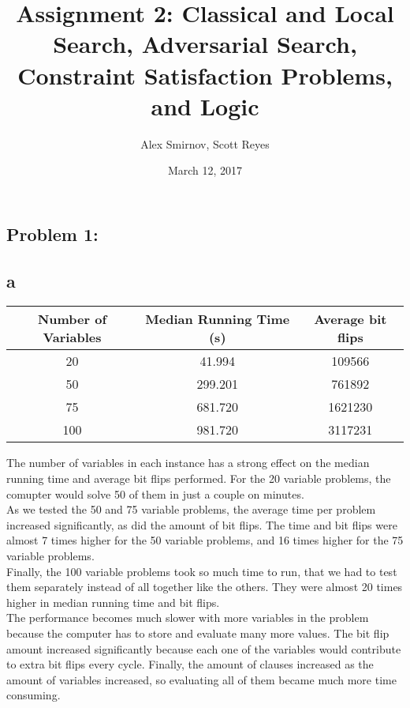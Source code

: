 \documentclass[11pt, oneside]{article}   	%
\title{Assignment 2: Classical and Local Search, Adversarial Search, Constraint Satisfaction Problems, and Logic}
\author{Alex Smirnov, Scott Reyes}
\date{March 12, 2017}							%
\begin{document}
\maketitle
\begin{flushleft}

\section*{Problem 1:}
\subsection*{a}
\begin{center}
\begin{tabular}{ |c|c|c|} 
\hline
Number of Variables & Median Running Time (s) & Average bit flips \\\hline
20 & 41.994 & 109566 \\\hline
50 & 299.201 & 761892 \\\hline
75 & 681.720 & 1621230 \\\hline
100 & 981.720 & 3117231 \\
\hline
\end{tabular}
\end{center}

The number of variables in each instance has a strong effect on the median running time and average bit flips performed. For the 20 variable problems, the comupter would solve 50 of them in just a couple on minutes. \\\medskip
As we tested the 50 and 75 variable problems, the average time per problem increased significantly, as did the amount of bit flips. The time and bit flips were almost 7 times higher for the 50 variable problems, and 16 times higher for the 75 variable problems. \\\medskip
Finally, the 100 variable problems took so much time to run, that we had to test them separately instead of all together like the others. They were almost 20 times higher in median running time and bit flips. \\\medskip
The performance becomes much slower with more variables in the problem because the computer has to store and evaluate many more values. The bit flip amount increased significantly because each one of the variables would contribute to extra bit flips every cycle. Finally, the amount of clauses increased as the amount of variables increased, so evaluating all of them became much more time consuming.\\\medskip


\end{flushleft}
\end{document}
